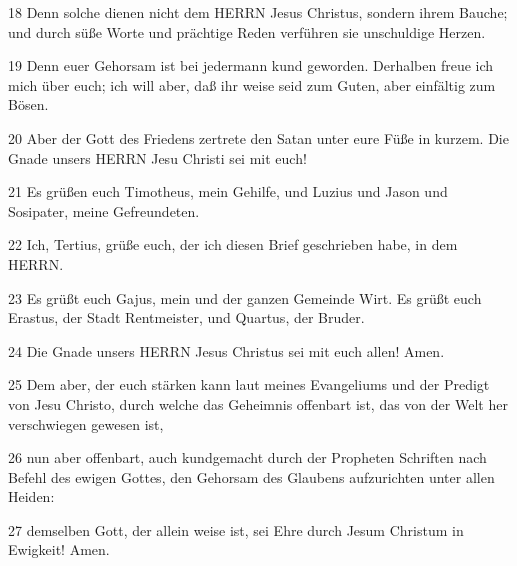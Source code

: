 \par 18 Denn solche dienen nicht dem HERRN Jesus Christus, sondern ihrem Bauche; und durch süße Worte und prächtige Reden verführen sie unschuldige Herzen.
\par 19 Denn euer Gehorsam ist bei jedermann kund geworden. Derhalben freue ich mich über euch; ich will aber, daß ihr weise seid zum Guten, aber einfältig zum Bösen.
\par 20 Aber der Gott des Friedens zertrete den Satan unter eure Füße in kurzem. Die Gnade unsers HERRN Jesu Christi sei mit euch!
\par 21 Es grüßen euch Timotheus, mein Gehilfe, und Luzius und Jason und Sosipater, meine Gefreundeten.
\par 22 Ich, Tertius, grüße euch, der ich diesen Brief geschrieben habe, in dem HERRN.
\par 23 Es grüßt euch Gajus, mein und der ganzen Gemeinde Wirt. Es grüßt euch Erastus, der Stadt Rentmeister, und Quartus, der Bruder.
\par 24 Die Gnade unsers HERRN Jesus Christus sei mit euch allen! Amen.
\par 25 Dem aber, der euch stärken kann laut meines Evangeliums und der Predigt von Jesu Christo, durch welche das Geheimnis offenbart ist, das von der Welt her verschwiegen gewesen ist,
\par 26 nun aber offenbart, auch kundgemacht durch der Propheten Schriften nach Befehl des ewigen Gottes, den Gehorsam des Glaubens aufzurichten unter allen Heiden:
\par 27 demselben Gott, der allein weise ist, sei Ehre durch Jesum Christum in Ewigkeit! Amen.


